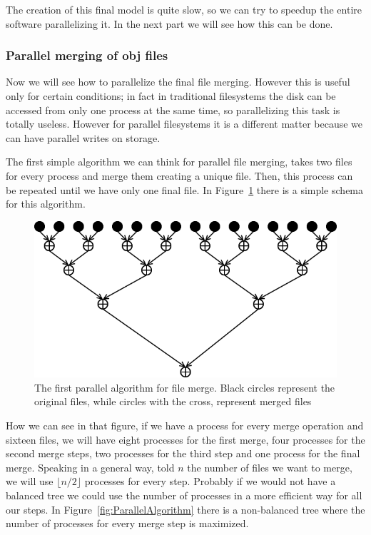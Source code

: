 \documentclass[11pt,oneside]{article}	%
\begin{document}
The creation of this final model is quite slow, so we can try to speedup the entire software parallelizing it. In the next part we will see how this can be done.

\subsubsection{Parallel merging of obj files}\label{sec:mergeObjParallel}

Now we will see how to parallelize the final file merging. However this is useful only for certain conditions; in fact in traditional filesystems the disk can be accessed from only one process at the same time, so parallelizing this task is totally useless. However for parallel filesystems it is a different matter because we can have parallel writes on storage.

The first simple algorithm we can think for parallel file merging, takes two files for every process and merge them creating a unique file. Then, this process can be repeated until we have only one final file. In Figure~\ref{fig:firstParallelAlgorithm} there is a simple schema for this algorithm.

\begin{figure}[htb] %
   \centering
   \includegraphics[width=0.40\linewidth]{images/FirstParallelAlgorithm.png}
   \caption{The first parallel algorithm for file merge. Black circles represent the original files, while circles with the cross, represent merged files}
   \label{fig:firstParallelAlgorithm}
\end{figure}

How we can see in that figure, if we have a process for every merge operation and sixteen files, we will have eight processes for the first merge, four processes for the second merge steps, two processes for the third step and one process for the final merge. Speaking in a general way, told $n$ the number of files we want to merge, we will use $\lfloor n/2 \rfloor$ processes for every step. Probably if we would not have a balanced tree we could use the number of processes in a more efficient way for all our steps. In Figure~\ref{fig:ParallelAlgorithm} there is a non-balanced tree where the number of processes for every merge step is maximized.
\end{document}
